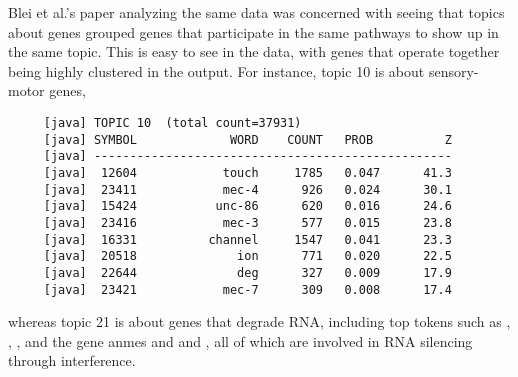 Blei et al.'s paper analyzing the same data was concerned with seeing
that topics about genes grouped genes that participate in the same
pathways to show up in the same topic.  This is easy to see in the data,
with genes that operate together being highly clustered in the output.
For instance, topic 10 is about sensory-motor genes,
%
\begin{verbatim}
     [java] TOPIC 10  (total count=37931)
     [java] SYMBOL             WORD    COUNT   PROB          Z
     [java] --------------------------------------------------
     [java]  12604            touch     1785   0.047      41.3
     [java]  23411            mec-4      926   0.024      30.1
     [java]  15424           unc-86      620   0.016      24.6
     [java]  23416            mec-3      577   0.015      23.8
     [java]  16331          channel     1547   0.041      23.3
     [java]  20518              ion      771   0.020      22.5
     [java]  22644              deg      327   0.009      17.9
     [java]  23421            mec-7      309   0.008      17.4

\end{verbatim}
%
whereas topic 21 is about genes that degrade RNA, including top tokens
such as , ,
,  and the gene anmes
 and  and
, all of which are involved in RNA silencing through
interference.

